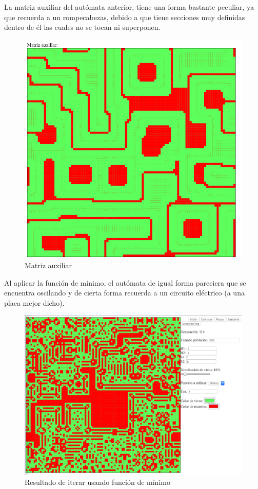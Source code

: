 	La matriz auxiliar del autómata anterior, tiene una forma bastante peculiar, ya que recuerda a un rompecabezas, debido a que tiene secciones muy definidas dentro de él las cuales no se tocan ni superponen.
	\begin{figure}[H]
		\begin{center}
			\includegraphics[scale=.3]{GOLM/img/regla3318-1-1.png}
			\caption{Matriz auxiliar}
			\label{fig:golm24}
		\end{center}
	\end{figure}


	Al aplicar la función de mínimo, el autómata de igual forma pareciera que se encuentra oscilando y de cierta forma recuerda a un circuito eléctrico (a una placa mejor dicho).
	\begin{figure}[H]
		\begin{center}
			\includegraphics[scale=.3]{GOLM/img/regla3318-2.png}
			\caption{Resultado de iterar usando función de mínimo}
			\label{fig:golm25}
		\end{center}
	\end{figure}

